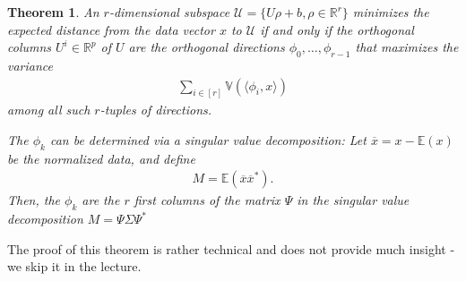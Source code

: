\documentclass{article}
\newcommand{\erw}{\mathbb{E}} %
\newcommand{\sprod}[1]{\langle #1 \rangle}
\newcommand{\calU}{\mathcal{U}}
\newcommand{\R}{\mathbb{R}}
\newtheorem{theorem}{Theorem}
\begin{document}
\begin{theorem} \label{th:svd}
   An $r$-dimensional subspace $\calU = \{U\rho+b, \rho \in \R^r\}$ minimizes the expected distance from the data vector $x$ to $\calU$ if and only if the orthogonal columns $U^i \in \R^p$ of $U$ are the orthogonal directions $\phi_0, \dots, \phi_{r-1}$ that maximizes the variance
   \begin{align} \label{eq:maxvar}
       \sum_{i \in [r]} \mathbb{V}(\sprod{\phi_i,x})
   \end{align}
   among all such $r$-tuples of directions.

   The $\phi_k$ can be determined via a singular value decomposition: Let $\overline{x}=x-\erw(x)$ be the normalized data, and define
   \begin{align*}
       M = \erw(\overline{x}\overline{x}^*).
   \end{align*}
    Then, the $\phi_k$ are the $r$ first columns of the matrix $\Psi$ in the singular value decomposition $M = \Psi \Sigma \Psi^*$
\end{theorem}

The proof of this theorem is rather technical and does not provide much insight - we skip it in the lecture.
\end{document}
